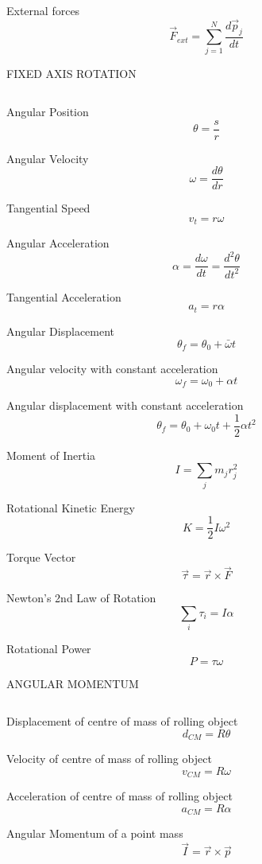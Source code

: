 \documentclass[12pt, letterpaper, twoside]{article}
\begin{document}
External forces
$$ \overrightarrow{F}_{ext} = \displaystyle\sum_{j=1}^{N} \frac{d \overrightarrow{p}_j}{dt} $$


\newpage



FIXED AXIS ROTATION

$$ $$


Angular Position
$$ \theta = \frac{s}{r} $$


Angular Velocity
$$ \omega = \frac{d \theta}{dr} $$


Tangential Speed
$$ v_t = r \omega $$

Angular Acceleration
$$ \alpha =\frac{d \omega}{dt} = \frac{d^2 \theta}{d t^2}$$


Tangential Acceleration
$$ a_t = r \alpha $$


Angular Displacement
$$ \theta_f = \theta_0 + \bar{\omega} t $$


Angular velocity with constant acceleration
$$ \omega_f = \omega_0 + \alpha t $$


Angular displacement with constant acceleration
$$ \theta_f = \theta_0 + \omega_0 t + \frac{1}{2} \alpha t^2 $$


Moment of Inertia
$$ I = \sum_j m_j r_j^2 $$


Rotational Kinetic Energy
$$ K = \frac{1}{2} I \omega^2 $$


Torque Vector
$$ \overrightarrow{\tau} = \overrightarrow{r} \times \overrightarrow{F}$$



Newton's 2nd Law of Rotation
$$ \sum_i \tau_i = I \alpha $$



Rotational Power
$$ P = \tau \omega $$











\newpage



ANGULAR MOMENTUM

$$ $$



Displacement of centre of mass of rolling object
$$ d_{CM} = R \theta $$


Velocity of centre of mass of rolling object
$$ v_{CM} = R \omega $$


Acceleration of centre of mass of rolling object
$$ a_{CM} = R \alpha $$


Angular Momentum of a point mass
$$ \overrightarrow{I} = \overrightarrow{r} \times \overrightarrow{p} $$
\end{document}
